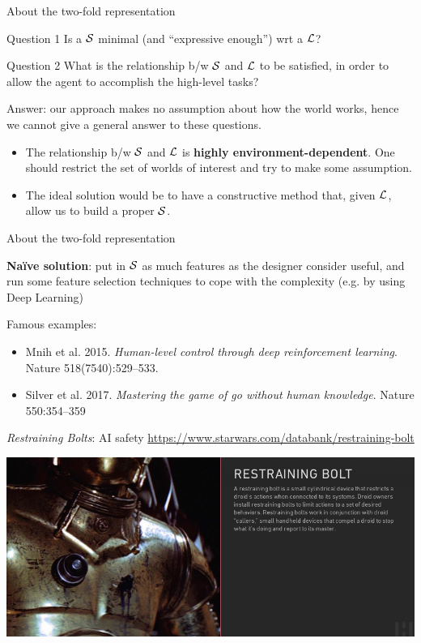 \documentclass{beamer}
\begin{document}
\begin{frame}{About the two-fold representation}
		
	\begin{block}{Question 1}
		Is a $\S$ minimal (and ``expressive enough'') wrt a $\L$?
	\end{block}
	
	\begin{block}{Question 2}
		What is the relationship b/w $\S$ and $\L$ to be satisfied, in order to allow the agent to accomplish the high-level tasks?
	\end{block}

	Answer: our approach makes no assumption about how the world works, hence we cannot give a general answer to these questions.\\
	
	\begin{itemize}
		\item The relationship b/w $\S$ and $\L$ is \textbf{highly environment-dependent}. One should restrict the set of worlds of interest and try to make some assumption.
		
		\item The ideal solution would be to have a constructive method that, given $\L$, allow us to build a proper $\S$.
	\end{itemize}

\end{frame}
\begin{frame}{About the two-fold representation}
	
	
	\textbf{Na\"ive solution}: put in $\S$ as much features as the designer consider useful, and run some feature selection techniques to cope with the complexity (e.g. by using Deep Learning)
	
	Famous examples:
	\begin{itemize}
		\item Mnih et al. 2015. \emph{Human-level control through deep reinforcement learning}. Nature 518(7540):529–533.
		\item Silver et al. 2017. \emph{Mastering the game of go without human knowledge}. Nature 550:354–359
	\end{itemize}
\end{frame}

\begin{frame}{\emph{Restraining Bolts}: AI safety}
	\url{https://www.starwars.com/databank/restraining-bolt}
	\begin{center}
	\includegraphics[width=\textwidth]{images//restraining-bolt}
	\end{center}

\end{frame}
\end{document}
